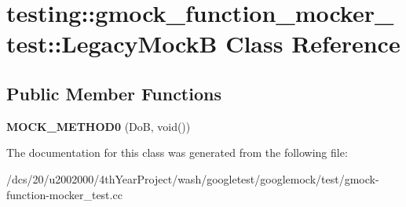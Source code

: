\hypertarget{classtesting_1_1gmock__function__mocker__test_1_1LegacyMockB}{}\section{testing\+:\+:gmock\+\_\+function\+\_\+mocker\+\_\+test\+:\+:Legacy\+MockB Class Reference}
\label{classtesting_1_1gmock__function__mocker__test_1_1LegacyMockB}
\subsection*{Public Member Functions}
\begin{DoxyCompactItemize}
\item 
\mbox{\label{classtesting_1_1gmock__function__mocker__test_1_1LegacyMockB_ae3e3eff80a8f7b110d0bebcfaa71a690}} 
{\bfseries M\+O\+C\+K\+\_\+\+M\+E\+T\+H\+O\+D0} (DoB, void())
\end{DoxyCompactItemize}


The documentation for this class was generated from the following file\+:\begin{DoxyCompactItemize}
\item 
/dcs/20/u2002000/4th\+Year\+Project/wash/googletest/googlemock/test/gmock-\/function-\/mocker\+\_\+test.\+cc\end{DoxyCompactItemize}
